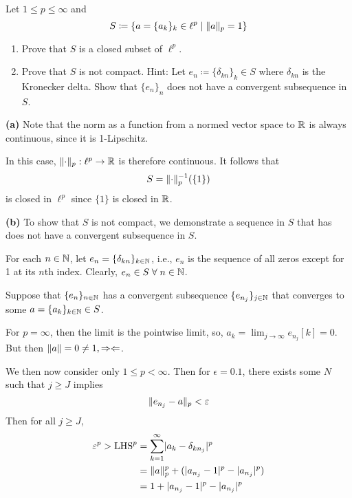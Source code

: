 \documentclass[a4paper, 10pt]{article}
\begin{document}
\begin{problem} [\done]
    Let $1 \leq p \leq \infty$ and \begin{equation*}
    S \coloneqq \{a = \{a_k\}_{k} \in \ell^p \mid \lVert a\rVert_p = 1    \}
    \end{equation*}

    \begin{enumerate}
    \item Prove that $S$ is a closed subset of $\ell^p$.
    \item Prove that $S$ is not compact. Hint: Let $e_n \coloneqq \{\delta_{kn}\}_k \in S$ where $\delta_{kn}$ is the Kronecker delta. Show that $\{e_n\}_n$ does not have a convergent subsequence in $S$.
    \end{enumerate}
\end{problem}
\begin{solution}
    \textbf{(a)} Note that the norm as a function from a normed vector space to $\mathbb{R}$  is always continuous, since it is 1-Lipschitz.

    In this case, $\lVert\cdot\rVert_p: \ell^p \to \mathbb{R}$ is therefore continuous. It follows that \begin{equation*}
    S = \lVert\cdot\rVert_p^{-1}(\{1\})
    \end{equation*}
    is closed in $\ell^p$ since $\{1\}$ is closed in $\mathbb{R}$.

    \textbf{(b)} To show that $S$ is not compact, we demonstrate a sequence in $S$ that has does not have a convergent subsequence in $S$.

    For each $n \in \mathbb{N}$, let $e_n = \{\delta_{kn}\}_{k \in \mathbb{N}}$, i.e., $e_n$ is the sequence of all zeros except for 1 at its $n$th index. Clearly, $e_n \in S \forall n \in \bbn$.

     Suppose that $\{e_n\}_{n \in \mathbb{N}}$ has a convergent subsequence $\{e_{n_j}\}_{j \in \mathbb{N}}$ that converges to some $a = \{a_k\}_{k \in \mathbb{N}} \in S$.
    
    For $p = \infty$, then the limit is the pointwise limit, so, $a_k = \lim_{j \to \infty} e_{n_j}[k] = 0$. But then $\lVert a\rVert = 0 \neq 1, \Rightarrow\Leftarrow$.

    We then now consider only $1 \leq p < \infty$. Then for $\epsilon = 0.1$, there exists some $N$ such that $j \geq J$ implies \begin{equation*}
     \lVert e_{n_j} - a\rVert_p < \varepsilon
    \end{equation*}
    Then for all $j \geq J$,
    \begin{align*}
        \varepsilon^p > \mathrm{LHS}^p &= \sum_{k=1}^{\infty} \lvert a_k - \delta_{kn_j}\rvert^p \\
        &= \lVert a\rVert_p^p + (\lvert a_{n_j} - 1\rvert^p - \lvert a_{n_j}\rvert^p) \\
        &= 1 + \lvert a_{n_j} - 1\rvert^p - \lvert a_{n_j}\rvert^p \\
    \end{align*}


\end{solution}
\end{document}
